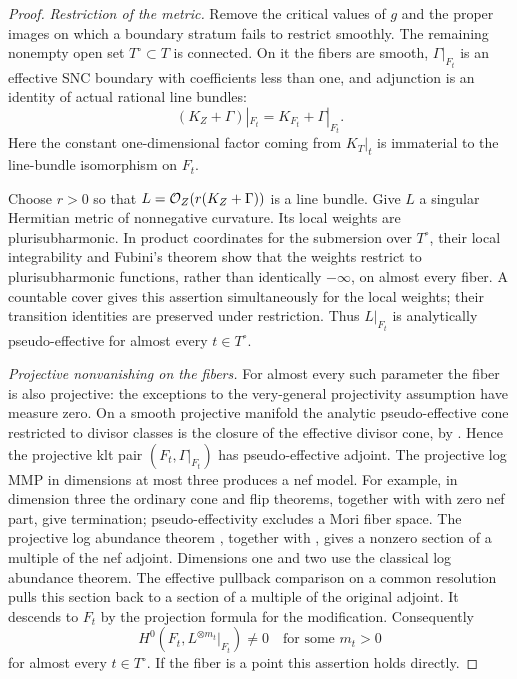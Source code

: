 \begin{proof}
\emph{Restriction of the metric.}
Remove the critical values of $g$ and the proper images on which a
boundary stratum fails to restrict smoothly.  The remaining nonempty
open set $T^\circ\subset T$ is connected.  On it the fibers are smooth,
$\Gamma|_{F_t}$ is an effective SNC boundary with coefficients less than
one, and adjunction is an identity of actual rational line bundles:
\begin{equation}\label{eq:supply-fiber-adjunction}
 (K_Z+\Gamma)|_{F_t}=K_{F_t}+\Gamma|_{F_t}.
\end{equation}
Here the constant one-dimensional factor coming from
$K_T|_t$ is immaterial to the line-bundle isomorphism on $F_t$.

Choose $r>0$ so that $L=\mathcal O_Z(r(K_Z+\Gamma))$ is a line bundle.  Give $L$
a singular Hermitian metric of nonnegative curvature.  Its local weights
are plurisubharmonic.  In product coordinates for the submersion over
$T^\circ$, their local integrability and Fubini's theorem show that the
weights restrict to plurisubharmonic functions, rather than identically
$-\infty$, on almost every fiber.  A countable cover gives this assertion
simultaneously for the local weights; their transition identities are
preserved under restriction.  Thus $L|_{F_t}$ is analytically
pseudo-effective for almost every $t\in T^\circ$.

\smallskip\noindent
\emph{Projective nonvanishing on the fibers.}
For almost every such parameter the fiber is also projective: the
exceptions to the very-general projectivity assumption have measure
zero.  On a smooth projective manifold the analytic pseudo-effective
cone restricted to divisor classes is the closure of the effective
divisor cone, by \cite[Proposition~1.2]{BDPP2013}.  Hence the projective
klt pair $(F_t,\Gamma|_{F_t})$ has pseudo-effective adjoint.  The
projective log MMP in dimensions at most three produces a nef model.
For example, in dimension three the ordinary cone and flip theorems,
together with \cite[Theorem~1.2]{CT2023} with zero nef part, give
termination; pseudo-effectivity excludes a Mori fiber space.  The
projective log abundance theorem
\cite[Theorem~1.1]{KMMAbundance1994}, together with
\cite[\S6.1]{MatsukiCorrection2003}, gives a nonzero section of a
multiple of the nef adjoint.  Dimensions one and two use the classical
log abundance theorem.  The effective pullback comparison on a common
resolution pulls this section back to a section of a multiple of the
original adjoint.  It descends to $F_t$ by the projection formula for the
modification.  Consequently
\begin{equation}\label{eq:supply-ae-nonvanishing}
 H^0(F_t,L^{\otimes m_t}|_{F_t})\ne0
 \quad\text{for some }m_t>0
\end{equation}
for almost every $t\in T^\circ$.  If the fiber is a point this assertion
holds directly.


\end{proof}
